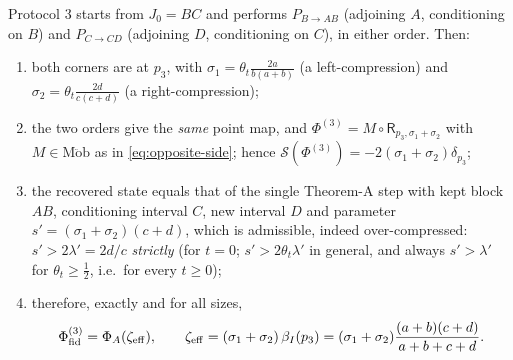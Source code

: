 \documentclass[11pt]{article}
\newcommand{\Sch}{\mathcal S}
\newcommand{\Mob}{\operatorname{M\ddot ob}}
\newcommand{\bI}{\beta_I}
\newcommand{\Rp}{\mathsf R}
\theoremstyle{definition}\newtheorem{example}[theorem]{Example}
\begin{document}
\begin{theorem}\label{thm:prot3}
Protocol 3 starts from $J_0=BC$ and performs $P_{B\to AB}$ (adjoining $A$, conditioning on $B$)
and $P_{C\to CD}$ (adjoining $D$, conditioning on $C$), in either order.  Then:
\begin{enumerate}[label=(\arabic*),leftmargin=2.2em]
\item both corners are at $p_3$, with
 $\sigma_1=\theta_t\frac{2a}{b(a+b)}$ (a left-compression) and
 $\sigma_2=\theta_t\frac{2d}{c(c+d)}$ (a right-compression);
\item the two orders give the \emph{same} point map, and
 $\Phi^{(3)}=M\circ\Rp_{p_3,\sigma_1+\sigma_2}$ with $M\in\Mob$ as in
 \eqref{eq:opposite-side}; hence $\Sch(\Phi^{(3)})=-2(\sigma_1+\sigma_2)\delta_{p_3}$;
\item the recovered state equals that of the single Theorem-A step with kept block $AB$,
 conditioning interval $C$, new interval $D$ and parameter
 $s'=(\sigma_1+\sigma_2)(c+d)$, which is admissible, indeed over-compressed:
 $s'>2\lambda'=2d/c$ \emph{strictly} (for $t=0$; $s'>2\theta_t\lambda'$ in general, and
 always $s'>\lambda'$ for $\theta_t\ge\frac12$, i.e.\ for every $t\ge0$);
\item therefore, exactly and for all sizes,
 \begin{equation}\label{eq:prot3}
  \Phi_{\rm fid}^{(3)}=\Phi_A(\zeta_{\rm eff}),\qquad
  \zeta_{\rm eff}=(\sigma_1+\sigma_2)\,\bI(p_3)
  =(\sigma_1+\sigma_2)\frac{(a+b)(c+d)}{a+b+c+d}.
 \end{equation}
\end{enumerate}
\end{theorem}
\end{document}
